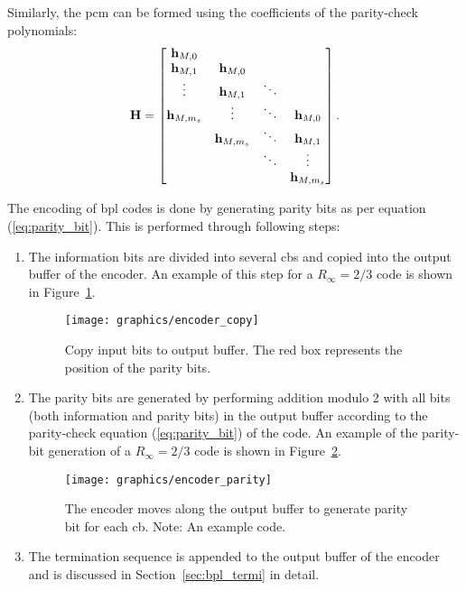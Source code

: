 Similarly, the \ac{pcm} can be formed using the coefficients of the parity-check polynomials:
\begin{align}\label{eq:bpl_pcm}
\mathbf{H}=
\begin{bmatrix}
\mathbf{h}_{M,0}\\
\mathbf{h}_{M,1} &\mathbf{h}_{M,0}\\
\vdots &\mathbf{h}_{M,1} &\ddots\\
\mathbf{h}_{M,m_s} &\vdots &\ddots &\mathbf{h}_{M,0}\\
&\mathbf{h}_{M,m_s} &\ddots &\mathbf{h}_{M,1}\\
& &\ddots &\vdots\\
& & &\mathbf{h}_{M,m_s}
\end{bmatrix}.
\end{align}

The encoding of \ac{bpl} codes is done by generating parity bits as per equation (\ref{eq:parity_bit}). This is performed through following steps:
\begin{enumerate}
  \item The information bits are divided into several \acp{cb} and copied into the output buffer of the encoder. An example of this step for a $R_\infty=2/3$ code is shown in Figure~\ref{fig:encode_copy}.
  \begin{figure}[htbp]
    \centering
    \texttt{[image: graphics/encoder\_copy]}
    \caption{Copy input bits to output buffer. The red box represents the position of the parity bits.}
    \label{fig:encode_copy}
  \end{figure}
  \item The parity bits are generated by performing addition modulo 2 with all bits (both information and parity bits) in the output buffer according to the parity-check equation (\ref{eq:parity_bit}) of the code. An example of the parity-bit generation of a $R_\infty=2/3$ code is shown in Figure~\ref{fig:encoder_paritygen}.
   \begin{figure}[htbp]
    \centering
    \texttt{[image: graphics/encoder\_parity]}
    \caption{The encoder moves along the output buffer to generate parity bit for each \ac{cb}. Note: An example code.}
    \label{fig:encoder_paritygen}
  \end{figure}
  \item The termination sequence is appended to the output buffer of the encoder and is discussed in Section~\ref{sec:bpl_termi} in detail.
\end{enumerate}

